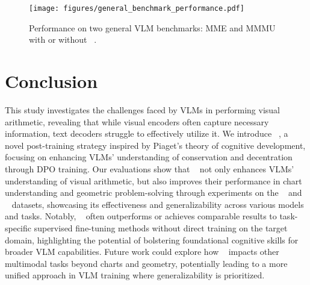 \begin{figure}[t]
    \centering
    \texttt{[image: figures/general\_benchmark\_performance.pdf]}
    \vspace{-4mm}
    \caption{Performance on two general VLM benchmarks: MME and MMMU with or without \method~.}
    \vspace{-5mm}
    \label{fig:general_benchamrk}
\end{figure}
\section{Conclusion}


This study investigates the challenges faced by VLMs in performing visual arithmetic, revealing that while visual encoders often capture necessary information, text decoders struggle to effectively utilize it.  We introduce \method~, a novel post-training strategy inspired by Piaget's theory of cognitive development, focusing on enhancing VLMs' understanding of conservation and decentration through DPO training. Our evaluations show that \method~ not only enhances VLMs' understanding of visual arithmetic, but also improves their performance in chart understanding and geometric problem-solving through experiments on the \chocolate~ and \mathv~ datasets, showcasing its effectiveness and generalizability across various models and tasks. Notably, \method~ often outperforms or achieves comparable results to task-specific supervised fine-tuning methods without direct training on the target domain, highlighting the potential of bolstering foundational cognitive skills for broader VLM capabilities. Future work could explore how \method~ impacts other multimodal tasks beyond charts and geometry, potentially leading to a more unified approach in VLM training where generalizability is prioritized. 

